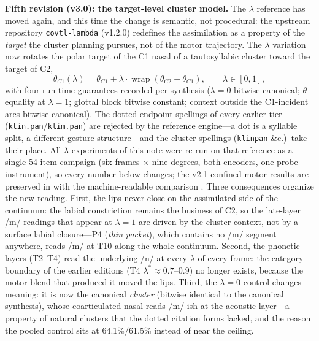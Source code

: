 \documentclass[11pt,a4paper]{article}
\newcommand{\sampa}[1]{\texttt{#1}}
\newcommand{\lam}{\lambda}
\begin{document}
\medskip\noindent
\textbf{Fifth revision (v3.0): the target-level cluster model.} The
$\lam$ reference has moved again, and this time the change is
semantic, not procedural: the upstream repository
\texttt{covtl-lambda} (v1.2.0) redefines the assimilation as a
property of the \emph{target} the cluster planning pursues, not of
the motor trajectory. The $\lam$ variation now rotates the polar
target of the C1 nasal of a tautosyllabic cluster toward the target
of C2,
\begin{equation*}
\theta_{C1}(\lam) = \theta_{C1} + \lam \cdot
\operatorname{wrap}(\theta_{C2} - \theta_{C1}),\qquad \lam \in [0,1],
\end{equation*}
with four run-time guarantees recorded per synthesis ($\lam=0$
bitwise canonical; $\theta$ equality at $\lam=1$; glottal block
bitwise constant; context outside the C1-incident arcs bitwise
canonical). The dotted endpoint spellings of every earlier tier
(\sampa{klin.pan}/\sampa{klim.pan}) are rejected by the reference
engine---a dot is a syllable split, a different gesture
structure---and the cluster spellings (\sampa{klinpan} \&c.)\ take
their place. All $\lam$ experiments of this note were re-run on that
reference as a single 54-item campaign (six frames $\times$ nine
degrees, both encoders, one probe instrument), so every number below
changes; the v2.1 confined-motor results are preserved in
 with the machine-readable comparison
. Three consequences organize
the new reading. First, the lips never close on the assimilated side
of the continuum: the labial constriction remains the business of
C2, so the late-layer /m/ readings that appear at $\lam=1$ are
driven by the cluster context, not by a surface labial closure---P4
(\emph{thin packet}), which contains no /m/ segment anywhere, reads
/m/ at T10 along the whole continuum. Second, the phonetic layers
(T2--T4) read the underlying /n/ at every $\lam$ of every frame:
the category boundary of the earlier editions (T4 $\lam^{*} \approx
0.7$--$0.9$) no longer exists, because the motor blend that produced
it moved the lips. Third, the $\lam=0$ control changes meaning: it
is now the canonical \emph{cluster} (bitwise identical to the
canonical synthesis), whose coarticulated nasal reads /m/-ish at the
acoustic layer---a property of natural clusters that the dotted
citation forms lacked, and the reason the pooled control sits at
64.1\%/61.5\% instead of near the ceiling.
\end{document}
